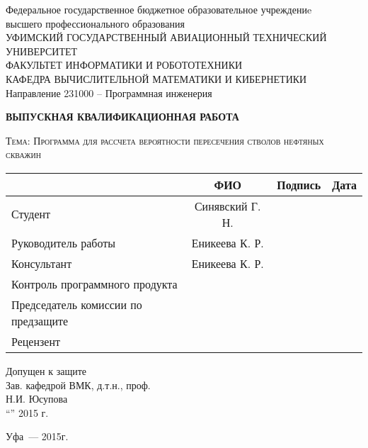 \begin{titlepage}
\newpage

\begin{center}
Федеральное государственное бюджетное образовательное учреждениe\\
высшего профессионального образования \\
\vspace{0.5cm}
\footnotesize УФИМСКИЙ ГОСУДАРСТВЕННЫЙ АВИАЦИОННЫЙ ТЕХНИЧЕСКИЙ УНИВЕРСИТЕТ\\
\vspace{0.5cm}
ФАКУЛЬТЕТ  ИНФОРМАТИКИ  И  РОБОТОТЕХНИКИ \\
\vspace{0.5cm}
КАФЕДРА  ВЫЧИСЛИТЕЛЬНОЙ  МАТЕМАТИКИ  И  КИБЕРНЕТИКИ\\
\vspace{0.5cm}
\normalsize Направление 231000 – Программная инженерия
\end{center}
 
\vspace{2em}

\begin{center}
\textbf{ВЫПУСКНАЯ КВАЛИФИКАЦИОННАЯ РАБОТА}
\end{center}

\vspace{2.5em}
 
\begin{center}
\textsc{Тема: Программа для рассчета вероятности пересечения стволов нефтяных скважин}
\end{center}

\vspace{3em}
 
\begin{table}[H]
\begin{tabularx}{\textwidth}{|l|c|l|l|}
\hline
& ФИО & Подпись & Дата\\
\hline
Студент & Синявский Г. Н. &&\\
\hline
Руководитель работы & Еникеева К. Р. &&\\
\hline
Консультант & Еникеева К. Р. &&\\
\hline
Контроль программного продукта &&&\\
\hline
Председатель комиссии по предзащите &&&\\
\hline
Рецензент &&& \\
\hline

\end{tabularx}
\end{table} 

\footnotesize
\vspace{1em}
\center Допущен к защите\\
Зав. кафедрой  ВМК, д.т.н., проф.\\
\underline{\hspace{5cm}} Н.И. Юсупова\\
“\underline{\hspace{1cm}}”\underline{\hspace{5cm}} 2015 г.
\normalsize
\vspace{\fill}

\begin{center}
Уфа~--- 2015г.
\end{center}

\end{titlepage}